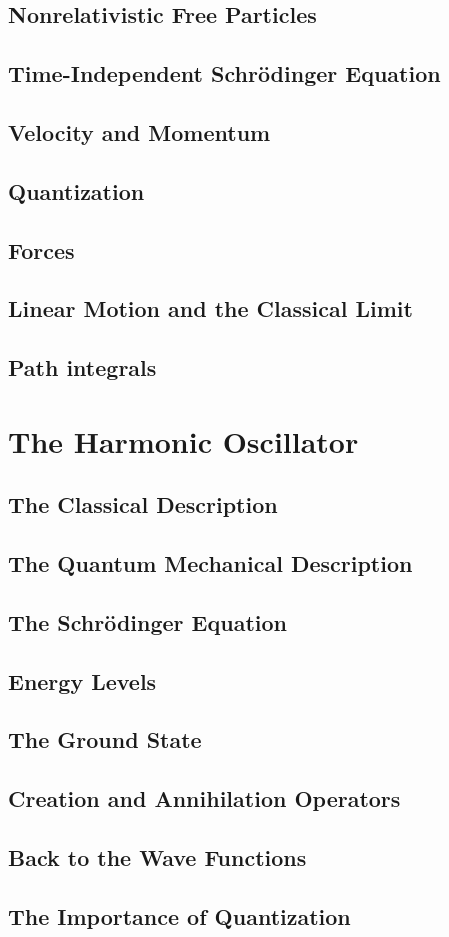 \documentclass[a4paper]{article}
\begin{document}
\subsection{Nonrelativistic Free Particles}
\subsection{Time-Independent Schr\"odinger Equation}
%
\subsection{Velocity and Momentum}
%
\subsection{Quantization}
\subsection{Forces}
%
\subsection{Linear Motion and the Classical Limit}
\subsection{Path integrals}
\section{The Harmonic Oscillator}
\subsection{The Classical Description}
%
\subsection{The Quantum Mechanical Description}
\subsection{The Schr\"odinger Equation}
\subsection{Energy Levels}
\subsection{The Ground State}
\subsection{Creation and Annihilation Operators}
\subsection{Back to the Wave Functions}
\subsection{The Importance of Quantization}
\end{document}
